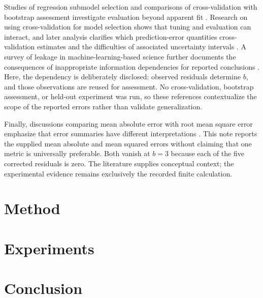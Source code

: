 \documentclass[11pt]{article}
\begin{document}
Studies of regression submodel selection and comparisons of cross-validation with bootstrap assessment investigate evaluation beyond apparent fit \cite{Breiman1992SubmodelSelection,Kohavi1995CrossvalidationBootstrap}. Research on using cross-validation for model selection shows that tuning and evaluation can interact, and later analysis clarifies which prediction-error quantities cross-validation estimates and the difficulties of associated uncertainty intervals \cite{Varma2006BiasError,Bates2023CrossvalidationWhat}. A survey of leakage in machine-learning-based science further documents the consequences of inappropriate information dependencies for reported conclusions \cite{Kapoor2023LeakageReproducibility}. Here, the dependency is deliberately disclosed: observed residuals determine $b$, and those observations are reused for assessment. No cross-validation, bootstrap assessment, or held-out experiment was run, so these references contextualize the scope of the reported errors rather than validate generalization.

Finally, discussions comparing mean absolute error with root mean square error emphasize that error summaries have different interpretations \cite{Willmott2005AdvantagesMean}. This note reports the supplied mean absolute and mean squared errors without claiming that one metric is universally preferable. Both vanish at $b=3$ because each of the five corrected residuals is zero. The literature supplies conceptual context; the experimental evidence remains exclusively the recorded finite calculation.
\section{Method}
\section{Experiments}
\section{Conclusion}


\end{document}
